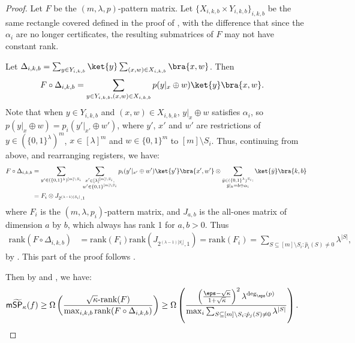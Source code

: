 \documentclass[11pt]{article}
\numberwithin{equation}{section}
\theoremstyle{definition}
\theoremstyle{plain}
\begin{document}
\begin{proof}
Let $F$ be the $(m,\lambda,p)$-pattern matrix. Let $\{X_{i,k,b}\times Y_{i,k,b}\}_{i,k,b}$ be the same rectangle covered defined in the proof of , with the difference that since the $\alpha_i$ are no longer certificates, the resulting submatrices of $F$ may not have constant rank. 

Let $\Delta_{i,k,b}=\sum_{y\in Y_{i,k,b}}\ket{y}\sum_{(x,w)\in X_{i,k,b}}\bra{x,w}$. Then 
\begin{align*}
F\circ \Delta_{i,k,b} &= \sum_{y\in Y_{i,k,b},(x,w)\in X_{i,k,b}}p(y|_x\oplus w)\ket{y}\bra{x,w}.
\end{align*}
Note that when $y\in Y_{i,k,b}$ and $(x,w)\in X_{i,b,k}$, $y|_x\oplus w$ satisfies $\alpha_i$, 
so $p(y|_x\oplus w)=p_i(y'|_{x'}\oplus w')$, where $y'$, $x'$ and $w'$ are restrictions of $y\in(\{0,1\}^\lambda)^m$, $x\in[\lambda]^m$ and $w\in\{0,1\}^m$ to $[m]\setminus S_i$. Thus, continuing from above, and rearranging registers, we have:
\begin{align*}
F\circ \Delta_{i,k,b}&= \sum_{y'\in (\{0,1\}^{\lambda})^{[m]\setminus S_i}}\sum_{\substack{x'\in [\lambda]^{[m]\setminus S_i},\\ w'\in\{0,1\}^{[m]\setminus S_i}}}p_i(y'|_{x'}\oplus w')\ket{y'}\bra{x',w'}\otimes \sum_{\substack{\bar{y}\in(\{0,1\}^\lambda)^{S_i}:\\ \bar{y}|_k=b\oplus\alpha_i}}\ket{\bar{y}}\bra{k,b}\\
&= F_i\otimes J_{2^{(\lambda-1)|S_i|},1}
\end{align*}
where $F_i$ is the $(m,\lambda,p_i)$-pattern matrix, and $J_{a,b}$ is the all-ones matrix of dimension $a$ by $b$, which always has rank 1 for $a,b>0$. Thus
\begin{align*}
\mbox{rank}(F\circ\Delta_{i,k,b}) &=\mathrm{rank}(F_i)\mathrm{rank}(J_{2^{(\lambda-1)|S_i|},1})=\mathrm{rank}(F_i)=\sum_{S\subseteq[m]\setminus S_i:\hat{p}_i(S)\neq 0}\lambda^{|S|},
\end{align*}
by \cite{She09}. This part of the proof follows \cite[Lemma IV.6]{RPRC16}.

Then by  and , we have:
\begin{align*}
\mathsf{m}\widetilde{\mathsf{SP}}_{\kappa}(f) &\geq \Omega\left(\frac{\sqrt{\kappa}\mbox{-rank}(F)}{\max_{i,k,b}\mathrm{rank}(F\circ\Delta_{i,k,b})}\right)
\geq \Omega\left( \frac{\left(\frac{\eps-\sqrt{\kappa}}{1+\sqrt{\kappa}}\right)^2\lambda^{\deg_\eps(p)}}{\max_i\sum_{S\subseteq[m]\setminus S_i:\hat{p}_j(S)\neq 0}\lambda^{|S|}} \right).\qedhere
\end{align*}
\end{proof}
\end{document}
